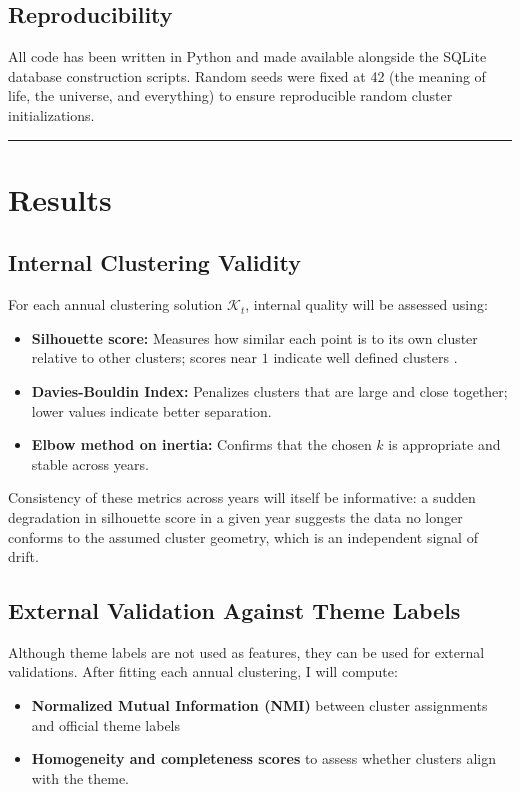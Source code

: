 \documentclass[11pt, letterpaper]{article}
\begin{document}
\subsection{Reproducibility}

All code has been written in Python and made available alongside the SQLite database construction scripts. Random seeds were fixed at 42 (the meaning of life, the universe, and everything) to ensure reproducible random cluster initializations. 

\noindent\rule{\textwidth}{0.4pt}

\section{Results}

\subsection{Internal Clustering Validity}

For each annual clustering solution $\mathcal{K}_t$, internal quality will be assessed using:
\begin{itemize}
    \item \textbf{Silhouette score:} Measures how similar each point is to its own cluster relative to other clusters; scores near $1$ indicate well defined clusters \cite{rousseeuw1987silhouettes}.
    \item \textbf{Davies-Bouldin Index:} Penalizes clusters that are large and close together; lower values indicate better separation.
    \item \textbf{Elbow method on inertia:} Confirms that the chosen $k$ is appropriate and stable across years.
\end{itemize}

Consistency of these metrics across years will itself be informative: a sudden degradation in silhouette score in a given year suggests the data no longer conforms to the assumed cluster geometry, which is an independent signal of drift.

\subsection{External Validation Against Theme Labels}

Although theme labels are not used as features, they can be used for external validations. After fitting each annual clustering, I will compute:
\begin{itemize}
    \item \textbf{Normalized Mutual Information (NMI)} between cluster assignments and official theme labels
    \item \textbf{Homogeneity and completeness scores} to assess whether clusters align with the theme.
\end{itemize}
\end{document}
